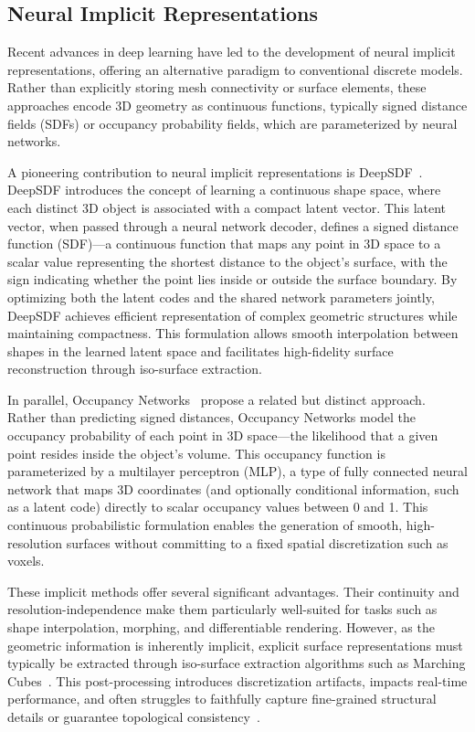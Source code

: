 \subsection{Neural Implicit Representations}
Recent advances in deep learning have led to the development of neural implicit representations, offering an alternative paradigm to conventional discrete models.
Rather than explicitly storing mesh connectivity or surface elements, these approaches encode 3D geometry as continuous functions, typically signed distance fields (SDFs) or occupancy probability fields, which are parameterized by neural networks.

A pioneering contribution to neural implicit representations is DeepSDF~\cite{Park2019}.
DeepSDF introduces the concept of learning a continuous shape space, where each distinct 3D object is associated with a compact latent vector.
This latent vector, when passed through a neural network decoder, defines a signed distance function (SDF)—a continuous function that maps any point in 3D space to a scalar value representing the shortest distance to the object's surface, with the sign indicating whether the point lies inside or outside the surface boundary.
By optimizing both the latent codes and the shared network parameters jointly, DeepSDF achieves efficient representation of complex geometric structures while maintaining compactness.
This formulation allows smooth interpolation between shapes in the learned latent space and facilitates high-fidelity surface reconstruction through iso-surface extraction.

In parallel, Occupancy Networks~\cite{mescheder2019occupancy} propose a related but distinct approach.
Rather than predicting signed distances, Occupancy Networks model the occupancy probability of each point in 3D space—the likelihood that a given point resides inside the object's volume.
This occupancy function is parameterized by a multilayer perceptron (MLP), a type of fully connected neural network that maps 3D coordinates (and optionally conditional information, such as a latent code) directly to scalar occupancy values between 0 and 1.
This continuous probabilistic formulation enables the generation of smooth, high-resolution surfaces without committing to a fixed spatial discretization such as voxels.

These implicit methods offer several significant advantages.
Their continuity and resolution-independence make them particularly well-suited for tasks such as shape interpolation, morphing, and differentiable rendering.
However, as the geometric information is inherently implicit, explicit surface representations must typically be extracted through iso-surface extraction algorithms such as Marching Cubes~\cite{lorensen1987marching}.
This post-processing introduces discretization artifacts, impacts real-time performance, and often struggles to faithfully capture fine-grained structural details or guarantee topological consistency~\cite{sitzmann2020implicit}.


